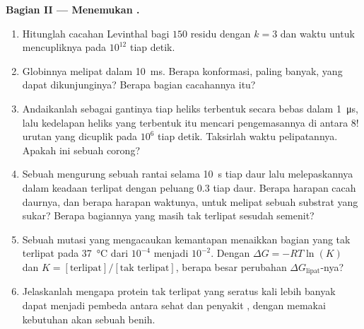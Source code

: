 \begin{problem}
\medskip
\noindent\textbf{Bagian II --- Menemukan .}
\begin{enumerate}[resume]
  \item Hitunglah cacahan Levinthal bagi $150$ residu dengan $k = 3$
        dan waktu untuk mencupliknya pada $10^{12}$ tiap detik.
  \item Globinnya melipat dalam \qty{10}{ms}. Berapa konformasi, paling
        banyak, yang dapat dikunjunginya? Berapa bagian cacahannya itu?
  \item Andaikanlah sebagai gantinya tiap heliks terbentuk secara bebas dalam
        \qty{1}{\micro s}, lalu kedelapan heliks yang terbentuk itu mencari
        pengemasannya di antara $8!$ urutan yang dicuplik pada $10^{6}$ tiap
        detik. Taksirlah waktu pelipatannya. Apakah ini sebuah corong?
  \item Sebuah  mengurung sebuah rantai selama \qty{10}{s} tiap daur
        lalu melepaskannya dalam keadaan terlipat dengan peluang $0.3$ tiap
        daur. Berapa harapan cacah daurnya, dan berapa harapan waktunya,
        untuk melipat sebuah substrat yang sukar? Berapa bagiannya yang
        masih tak terlipat sesudah semenit?
  \item Sebuah mutasi yang mengacaukan kemantapan menaikkan bagian yang tak
        terlipat pada \qty{37}{\celsius} dari $10^{-4}$ menjadi $10^{-2}$.
        Dengan $\Delta G =
        -RT\ln(K)$ dan $K = [\text{terlipat}]/[\text{tak terlipat}]$, berapa
        besar perubahan $\Delta G_{\text{lipat}}$-nya?
  \item Jelaskanlah mengapa protein tak terlipat yang seratus kali lebih
        banyak dapat menjadi pembeda antara sehat dan penyakit ,
        dengan memakai kebutuhan akan sebuah benih.
\end{enumerate}


\end{problem}
